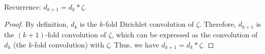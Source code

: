 \begin{theorem}[d succ]
\label{d_succ}
\leanok
Recurrence: $d_{k+1} = d_k * \zeta$.
\end{theorem}
\begin{proof}
\leanok
By definition, $d_k$ is the $k$-fold Dirichlet convolution of $\zeta$. Therefore, $d_{k + 1}$ is the $(k + 1)$-fold convolution of $\zeta$, which can be expressed as the convolution of $d_k$ (the $k$-fold convolution) with $\zeta$. Thus, we have $d_{k + 1} = d_k * \zeta$.
\end{proof}
